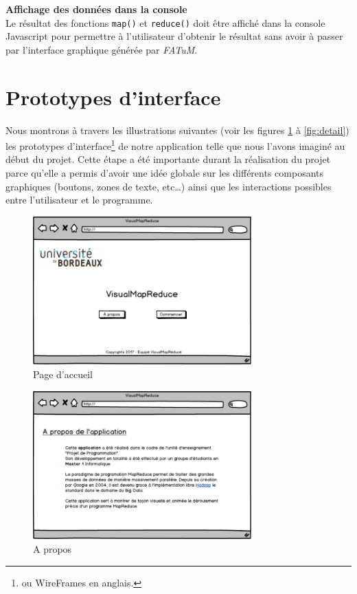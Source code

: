 \textbf{Affichage des données dans la console\\} Le résultat des fonctions \texttt{map()} et \texttt{reduce()} doit être affiché dans la console Javascript pour permettre à l'utilisateur d'obtenir le résultat sans avoir à passer par l'interface graphique générée par \textit{FATuM}.


\section{Prototypes d'interface}%
Nous montrons à travers les illustrations suivantes (voir les figures \ref{fig:acceuil} à \ref{fig:detail}) les prototypes d'interface\footnote{ou WireFrames en anglais.} de notre application telle que nous l'avons imaginé au début du projet. Cette étape a été importante durant la réalisation du projet parce qu'elle a permis d'avoir une idée globale sur les différents composants graphiques (boutons, zones de texte, etc…) ainsi que les interactions possibles entre l'utilisateur et le programme.\\ 
\begin{figure}[H]
  \centering
    \includegraphics[width=0.75\textwidth]{images/interface/page_accueil.png}
    \caption{Page d'accueil}
    \label{fig:acceuil}
\end{figure}

\begin{figure}[H]
  \centering
    \includegraphics[width=0.75\textwidth]{images/interface/page_a_propos.png}
    \caption{A propos}
    \label{propos}
\end{figure}

